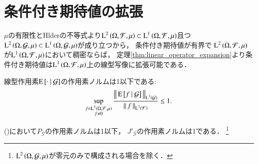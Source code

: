 \section{条件付き期待値の拡張}
	$\mu$の有限性とHlderの不等式より$\operatorname{L}^{2} \left(\Omega,\mathcal{F},\mu\right) \subset \operatorname{L}^{1} \left(\Omega,\mathcal{F},\mu\right)$且つ
	$\operatorname{L}^{2} \left(\Omega,\mathcal{G},\mu\right) \subset \operatorname{L}^{1} \left(\Omega,\mathcal{G},\mu\right)$が成り立つから，
	条件付き期待値が有界で
	$\operatorname{L}^{2} \left(\Omega,\mathcal{F},\mu\right)$が$\operatorname{L}^{1} \left(\Omega,\mathcal{F},\mu\right)$において稠密ならば，
	定理\ref{thm:linear_operator_expansion}より条件付き期待値は$\operatorname{L}^{1} \left(\Omega,\mathcal{F},\mu\right)$上の線型写像に拡張可能である．
	
	\begin{screen}
		\begin{lem}[条件付き期待値の有界性]
			線型作用素$\operatorname{E} \left[ \cdot \ \middle|\ \mathcal{G} \right]$の作用素ノルムは1以下である:
			\begin{align}
				\operatorname*{sup}_{\substack{f \in \operatorname{L}^{2} \left(\Omega,\mathcal{F},\mu\right) \\ f \neq 0}} \frac{ \left\|\, \operatorname{E} \left[ f \ \middle|\ \mathcal{G} \right]\, \right\|_{\operatorname{L}^{1} \left(\mathcal{G}\right)} }{ \left\|\, f\, \right\|_{\operatorname{L}^{1} \left(\mathcal{F}\right)} } \leq 1.
			\end{align}
			\label{lem:conditional_exp_bound}
		\end{lem}
	\end{screen}
	
	\begin{prf}
		()において$P_{\mathcal{G}}$の作用素ノルムは1以下，
		${J'_{\mathcal{G}}}$の作用素ノルムは1である．
		\footnote{
			$\operatorname{L}^{2} \left(\Omega,\mathcal{G},\mu\right)$が零元のみで構成される場合を除く．
		}
		\begin{comment}
			命題\ref{prp:L2_conditional_expectation}のC2より，任意の$0 \neq f \in \Lp{1}{\Omega,\mathcal{F},\mu}$に対して
			\begin{align}
				\Norm{\cexp{f}{\mathcal{G}}}{\Lp{1}{\mathcal{G}}} 
				&= \int_\Omega \left| \cexp{f}{\mathcal{G}}(x) \right|\ \mu(dx) \\
				&= \int_\Omega \cexp{f}{\mathcal{G}}(x) \defunc_{\left\{ \cexp{f}{\mathcal{G}} \geq 0\right \}}(x) 
					- \cexp{f}{\mathcal{G}}(x) \defunc_{\left\{ \cexp{f}{\mathcal{G}} < 0\right\} }(x)\ \mu(dx) \\
				&= \int_\Omega f(x) \defunc_{\left\{ \cexp{f}{\mathcal{G}} \geq 0\right\} }(x) - f(x) \defunc_{\left\{ \cexp{f}{\mathcal{G}} < 0\right\} }(x)\ \mu(dx) \\
				&\leq \int_\Omega |f(x)| \defunc_{\left\{ \cexp{f}{\mathcal{G}} \geq 0\right\} }(x) + |f(x)| \defunc_{\left\{ \cexp{f}{\mathcal{G}} < 0\right\} }(x)\ \mu(dx) \\
				&= \Norm{f}{\Lp{1}{\mathcal{F}}}.
			\end{align}
			が成り立つ．
		\end{comment}
		\QED
	\end{prf}

